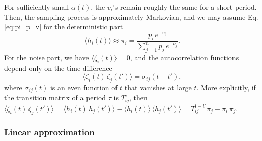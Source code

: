 \documentclass[reprint, floatfix]{revtex4-1}
\begin{document}
For sufficiently small $\alpha(t)$,
the $v_i$'s remain roughly the same for a short period.
%
Then,
the sampling process is approximately Markovian, %
and we may assume Eq. \eqref{eq:pi_p_v}
for the deterministic part
%
\begin{equation}
  \langle h_i(t) \rangle
  \approx
  \pi_i
  =
  \frac{ p_i \, e^{-v_i} }
  { \sum_{j = 1}^n p_j \, e^{-v_j} }.
  \label{eq:h_ave}
\end{equation}
%
%
%
For the noise part, we have
$\langle \zeta_i(t) \rangle = 0$,
%
and the autocorrelation functions
depend only on the time difference
%
\begin{equation}
  \langle \zeta_i(t) \, \zeta_j(t') \rangle
  =
  \sigma_{ij}(t - t'),
  \label{eq:zeta_zeta_correlation}
\end{equation}
%
where $\sigma_{ij}(t)$ is an even function of $t$
that vanishes at large $t$.
%
More explicitly,
if the transition matrix of a period $\tau$
is $T^\tau_{ij}$,
then
$
  \langle \zeta_i(t) \, \zeta_j(t') \rangle
  =
  \langle h_i(t) \, h_j(t') \rangle
  -
  \langle h_i(t) \rangle \, \langle h_j(t') \rangle
  =
  T^{t - t'}_{ij} \pi_j - \pi_i \, \pi_j.
$




\subsubsection{Linear approximation}
\end{document}
